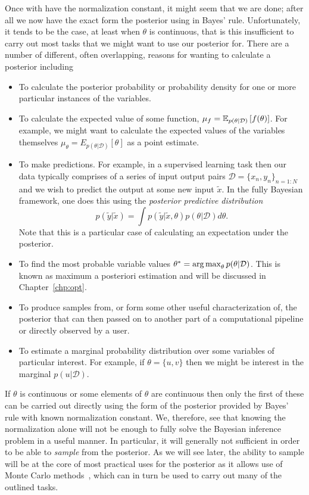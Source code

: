 Once with have the normalization constant, it might seem that we are done; after all
we now have the exact form the posterior using in Bayes' rule.  Unfortunately, it tends to
be the case, at least when $\theta$ is continuous, that is this insufficient to carry out most
tasks that we might want to use our posterior for.  There are a number of different, often
overlapping, reasons for wanting to calculate a posterior including
\begin{itemize}
	\item To calculate the posterior probability or probability density for one or more particular
	instances of the variables.
	\item To calculate the expected value of some function, $\mu_f = \mathbb{E}_{p(\theta|\mathcal{D})}\left[f(\theta)\right]$.
	For example, we might want to calculate the expected values of the variables themselves
	$\mu_\theta = E_{p(\theta|\mathcal{D})} \left[\theta\right]$ as a point estimate.
	\item To make predictions.  For example, in a supervised learning task then our data typically
	comprises of a series of input output pairs $\mathcal{D} = \{x_n,y_n\}_{n=1:N}$ and we
	wish to predict the output at some new input $\tilde{x}$.  In the fully Bayesian framework, one
	does this using the \emph{posterior predictive distribution}
	\[
	p(\tilde{y} | \tilde{x}) = \int p(\tilde{y}|\tilde{x},\theta) p(\theta | \mathcal{D}) d\theta.
	\]
	Note that this is a particular case of calculating an expectation under the posterior.
	\item To find the most probable variable values $\theta^* = \operatorname*{arg\,max}_{\theta} p(\theta|\mathcal{D})$.  
	This is known
	as maximum a posteriori estimation and will be discussed in Chapter~\ref{chp:opt}.
	\item To produce samples from, or form some other useful characterization of, the posterior that can
	then passed on to another part of a computational pipeline or directly observed by a user.
	\item To estimate a marginal probability distribution over some variables of particular
	interest.  For example, if $\theta=\{u,v\}$ then we might be interest in the marginal
	$p(u|\mathcal{D})$.
\end{itemize}
If $\theta$ is continuous or some elements of $\theta$ are continuous then only the first of
these can be carried out directly using the form of the posterior provided by Bayes' rule
with known normalization constant.  We, therefore, see that knowing the normalization alone
will not be enough to fully solve the Bayesian inference problem in a useful manner.  In
particular, it will generally not sufficient in order to be able to \emph{sample} from the
posterior.  As we will see later, the ability to sample will be at the core of most practical uses
for the posterior as it allows use of Monte Carlo
 methods~\citep{metropolis1949monte,robert2004monte,rubinstein2016simulation}, which
 can in turn be used to carry out many of the outlined tasks.

